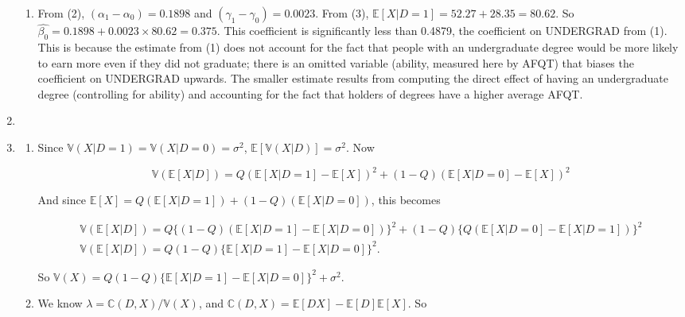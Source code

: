 \documentclass{article}
\begin{document}
\begin{enumerate}
\begin{enumerate}
		\item

		From (2), $(\alpha_1 - \alpha_0) = 0.1898$ and $(\gamma_1 - \gamma_0) = 0.0023$. From (3), $\mathbb{E}[X|D=1] = 52.27 + 28.35 = 80.62$. So $\hat{\beta_0} = 0.1898 + 0.0023 \times 80.62 = 0.375$. This coefficient is significantly less than 0.4879, the coefficient on UNDERGRAD from (1). This is because the estimate from (1) does not account for the fact that people with an undergraduate degree would be more likely to earn more even if they did not graduate; there is an omitted variable (ability, measured here by AFQT) that biases the coefficient on UNDERGRAD upwards. The smaller estimate results from computing the direct effect of having an undergraduate degree (controlling for ability) and accounting for the fact that holders of degrees have a higher average AFQT.

	\end{enumerate}

	\item


	\item

	\begin{enumerate}

		\item

		Since $\mathbb{V}(X|D=1) = \mathbb{V}(X|D=0) = \sigma^2$, $\mathbb{E}[\mathbb{V}(X|D)] = \sigma^2$. Now

		\begin{equation*}
		\mathbb{V}(\mathbb{E}[X|D]) = Q(\mathbb{E}[X|D=1] - \mathbb{E}[X])^2 + (1-Q)(\mathbb{E}[X|D=0] - \mathbb{E}[X])^2
		\end{equation*}

		And since $\mathbb{E}[X] = Q(\mathbb{E}[X|D=1]) + (1-Q)(\mathbb{E}[X|D=0])$, this becomes

		\begin{gather*}
		\mathbb{V}(\mathbb{E}[X|D]) = Q \{ (1-Q)(\mathbb{E}[X|D=1] - \mathbb{E}[X|D=0]) \} ^2 + (1-Q) \{ Q(\mathbb{E}[X|D=0] - \mathbb{E}[X|D=1]) \} ^2 \\
		\mathbb{V}(\mathbb{E}[X|D]) = Q (1-Q) \{ \mathbb{E}[X|D=1] - \mathbb{E}[X|D=0] \} ^2.
		\end{gather*}

		So $\mathbb{V}(X) = Q (1-Q) \{ \mathbb{E}[X|D=1] - \mathbb{E}[X|D=0] \} ^2 + \sigma^2$.

		\item

		We know $\lambda = \mathbb{C}(D,X) / \mathbb{V}(X)$, and $\mathbb{C}(D,X) = \mathbb{E}[DX] - \mathbb{E}[D]\mathbb{E}[X]$. So


\end{enumerate}
\end{enumerate}
\end{document}
